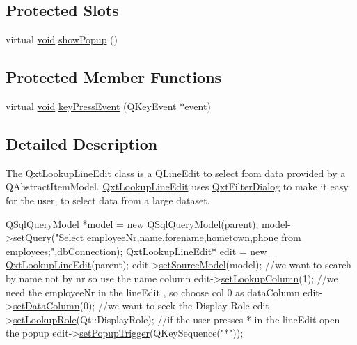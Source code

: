 \subsection*{Protected Slots}
\begin{DoxyCompactItemize}
\item 
virtual \hyperlink{group___u_a_v_objects_plugin_ga444cf2ff3f0ecbe028adce838d373f5c}{void} \hyperlink{class_qxt_lookup_line_edit_a8df8d42117a451e7238c0be6145e469f}{show\-Popup} ()
\end{DoxyCompactItemize}
\subsection*{Protected Member Functions}
\begin{DoxyCompactItemize}
\item 
virtual \hyperlink{group___u_a_v_objects_plugin_ga444cf2ff3f0ecbe028adce838d373f5c}{void} \hyperlink{class_qxt_lookup_line_edit_a743f41d45a94ff6254eb2d62f3ee5541}{key\-Press\-Event} (Q\-Key\-Event $\ast$event)
\end{DoxyCompactItemize}


\subsection{Detailed Description}
The \hyperlink{class_qxt_lookup_line_edit}{Qxt\-Lookup\-Line\-Edit} class is a Q\-Line\-Edit to select from data provided by a Q\-Abstract\-Item\-Model. \hyperlink{class_qxt_lookup_line_edit}{Qxt\-Lookup\-Line\-Edit} uses \hyperlink{class_qxt_filter_dialog}{Qxt\-Filter\-Dialog} to make it easy for the user, to select data from a large dataset. 


\begin{DoxyCode}
QSqlQueryModel *model = \textcolor{keyword}{new} QSqlQueryModel(parent);
model->setQuery(\textcolor{stringliteral}{"Select employeeNr,name,forename,hometown,phone from employees;"},dbConnection);
\hyperlink{class_qxt_lookup_line_edit}{QxtLookupLineEdit}* edit = \textcolor{keyword}{new} \hyperlink{class_qxt_lookup_line_edit_a9512e0cbe9c1ae6a67db85282ca1770e}{QxtLookupLineEdit}(parent);
edit->\hyperlink{class_qxt_lookup_line_edit_a44217a2dbcf221389ee982dd1abcdd3f}{setSourceModel}(model);
\textcolor{comment}{//we want to search by name not by nr so use the name column}
edit->\hyperlink{class_qxt_lookup_line_edit_a689dc79bd5093656d67f19e3d2b65b46}{setLookupColumn}(1);
\textcolor{comment}{//we need the employeeNr in the lineEdit , so choose col 0 as dataColumn}
edit->\hyperlink{class_qxt_lookup_line_edit_ae8090fb697322fe82f761ce9329912f4}{setDataColumn}(0);
\textcolor{comment}{//we want to seek the Display Role}
edit->\hyperlink{class_qxt_lookup_line_edit_a6edbf781f8e82221341a238ca23b1676}{setLookupRole}(Qt::DisplayRole);
\textcolor{comment}{//if the user presses * in the lineEdit open the popup}
edit->\hyperlink{class_qxt_lookup_line_edit_a0a7a95e44e0b81b5983a7743a27cf57b}{setPopupTrigger}(QKeySequence(\textcolor{stringliteral}{"*"}));
\end{DoxyCode}
 

